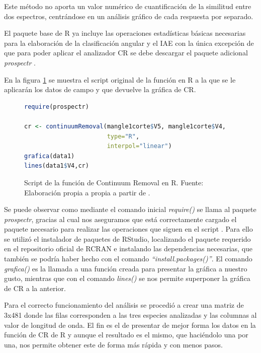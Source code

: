 Este método no aporta un valor numérico de cuantificación de la similitud entre dos espectros, centrándose en un análisis gráfico de cada respuesta por separado.\Sep

El paquete base de R ya incluye las operaciones estadísticas básicas necesarias para la elaboración de la clasificación angular y el \ac{IAE} con la única excepción de que para poder aplicar el analizador \ac{CR} se debe descargar el paquete adicional \textit{prospectr} \citep{stevens2014introduction}.\Sep

En la figura \ref{fig:CR} se muestra el script original de la función en R a la que se le aplicarán los datos de campo y que devuelve la gráfica de \ac{CR}.\Sep

\begin{figure}
\centering
\begin{lstlisting}[language = R, frame = single]
require(prospectr)

cr <- continuumRemoval(mangle1corte$V5, mangle1corte$V4,
                       type="R",
                       interpol="linear")
grafica(data1)
lines(data1$V4,cr)
\end{lstlisting}
\caption[Función de Continuum Removal]{Script de la función de Continuum Removal en R. Fuente: Elaboración propia a propia a partir de \cite{stevens2014introduction}.}
\label{fig:CR}
\end{figure}

Se puede observar como mediante el comando inicial \textit{require()} se llama al paquete \textit{prospectr}, gracias al cual nos aseguramos que está correctamente cargado el paquete necesario para realizar las operaciones que siguen en el script \citep{stevens2014introduction}. Para ello se utilizó el instalador de paquetes de RStudio, localizando el paquete requerido en el repositorio oficial de RCRAN e instalando las dependencias necesarias, que también se podría haber hecho con el comando \textit{``install.packages()''}. El comando \textit{grafica()} es la llamada a una función creada para presentar la gráfica a nuestro gusto, mientras que con el comando \textit{lines()} se nos permite superponer la gráfica de \ac{CR} a la anterior.\Sep

Para el correcto funcionamiento del análisis se procedió a crear una matriz de 3x481 donde las filas corresponden a las tres especies analizadas y las columnas al valor de longitud de onda. El fin es el de presentar de mejor forma los datos en la función de \ac{CR} de R y aunque el resultado es el mismo, que haciéndolo una por una, nos permite obtener este de forma más rápida y con menos pasos.\Sep

